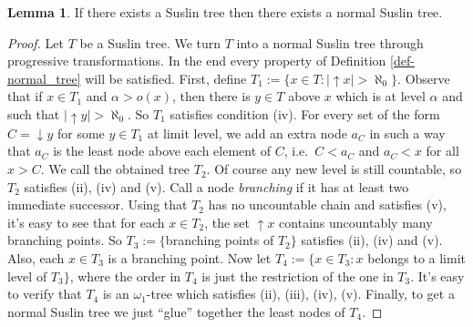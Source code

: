 \documentclass[12pt,a4paper]{report}
\theoremstyle{definition}
\newtheorem{lemma}[theorem]{Lemma}
\theoremstyle{num.custom-title}
\DeclareMathOperator{\down}{\downarrow}
\DeclareMathOperator{\up}{\uparrow}
\begin{document}
\begin{lemma}
If there exists a Suslin tree then there exists a normal Suslin tree.
\begin{proof}
Let $T$ be a Suslin tree. We turn $T$ into a normal Suslin tree through progressive transformations. In the end every property of Definition \ref{def-normal_tree} will be satisfied. First, define $T_1 := \{x \in T : |\up x| > \aleph_0\}$. Observe that if $x \in T_1$ and $\alpha > o(x)$, then there is $y \in T$ above $x$ which is at level $\alpha$ and such that $|\up y| > \aleph_0$. So $T_1$ satisfies condition (iv). For every set of the form $C = \down y$ for some $y \in T_1$ at limit level, we add an extra node $a_C$ in such a way that $a_C$ is the least node above each element of $C$, i.e.\ $C < a_C$ and $a_C < x$ for all $x > C$. We call the obtained tree $T_2$. Of course any new level is still countable, so $T_2$ satisfies (ii), (iv) and (v). Call a node \emph{branching} if it has at least two immediate successor. Using that $T_2$ has no uncountable chain and satisfies (v), it's easy to see that for each $x \in T_2$, the set $\up x$ contains uncountably many branching points. So $T_3 :=\{$branching points of $T_2\}$ satisfies (ii), (iv) and (v). Also, each $x \in T_3$ is a branching point. Now let $T_4 := \{x \in T_3 : x$ belongs to a limit level of $T_3\}$, where the order in $T_4$ is just the restriction of the one in $T_3$. It's easy to verify that $T_4$ is an $\omega_1$-tree which satisfies (ii), (iii), (iv), (v). Finally, to get a normal Suslin tree we just ``glue'' together the least nodes of $T_4$.
\end{proof}
\end{lemma}
\end{document}
